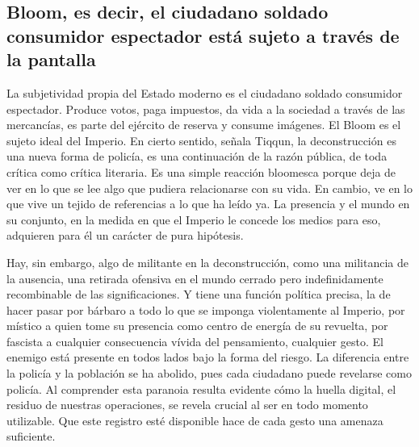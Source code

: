 \subsection{Bloom, es decir, el ciudadano soldado consumidor espectador está sujeto a través de la pantalla}
\label{sub:bloom-es-decir-el-ciudadano-soldado-consumidor-espectador-está-sujeto-a-través-de-la-pantalla}

La subjetividad propia del Estado moderno es el ciudadano soldado consumidor espectador. Produce votos, paga impuestos, da vida a la sociedad a través de las mercancías, es parte del ejército de reserva y consume imágenes. El Bloom es el sujeto ideal del Imperio. En cierto sentido, señala Tiqqun, la deconstrucción es una nueva forma de policía, es una continuación de la razón pública, de toda crítica como crítica literaria. Es una simple reacción bloomesca porque deja de ver en lo que se lee algo que pudiera relacionarse con su vida. En cambio, ve en lo que vive un tejido de referencias a lo que ha leído ya. La presencia y el mundo en su conjunto, en la medida en que el Imperio le concede los medios para eso, adquieren para él un carácter de pura hipótesis.

Hay, sin embargo, algo de militante en la deconstrucción, como una militancia de la ausencia, una retirada ofensiva en el mundo cerrado pero indefinidamente recombinable de las significaciones. Y tiene una función política precisa, la de hacer pasar por bárbaro a todo lo que se imponga violentamente al Imperio, por místico a quien tome su presencia como centro de energía de su revuelta, por fascista a cualquier consecuencia vívida del pensamiento, cualquier gesto. El enemigo está presente en todos lados bajo la forma del riesgo. La diferencia entre la policía y la población se ha abolido, pues cada ciudadano puede revelarse como policía. Al comprender esta paranoia resulta evidente cómo la huella digital, el residuo de nuestras operaciones, se revela crucial al ser en todo momento utilizable. Que este registro esté disponible hace de cada gesto una amenaza suficiente.

